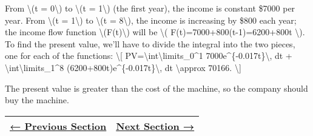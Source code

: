 From \textbackslash{}(t = 0\textbackslash{}) to \textbackslash{}(t =
1\textbackslash{}) (the first year), the income is constant \$7000 per
year. From \textbackslash{}(t = 1\textbackslash{}) to \textbackslash{}(t
= 8\textbackslash{}), the income is increasing by \$800 each year; the
income flow function \textbackslash{}(F(t)\textbackslash{}) will be
\textbackslash{}( F(t)=7000+800(t-1)=6200+800t \textbackslash{}). To
find the present value, we'll have to divide the integral into the two
pieces, one for each of the functions: \textbackslash{}{[}
PV=\textbackslash{}int\textbackslash{}limits\_0\^{}1
7000e\^{}\{-0.017t\}\textbackslash{}, dt +
\textbackslash{}int\textbackslash{}limits\_1\^{}8
(6200+800t)e\^{}\{-0.017t\}\textbackslash{}, dt \textbackslash{}approx
70166. \textbackslash{}{]}

The present value is greater than the cost of the machine, so the
company should buy the machine.

\begin{longtable}[]{@{}ll@{}}
\toprule
\endhead
\href{section3-6.php}{← Previous Section} & \href{section3-8.php}{Next
Section →}\tabularnewline
\bottomrule
\end{longtable}
